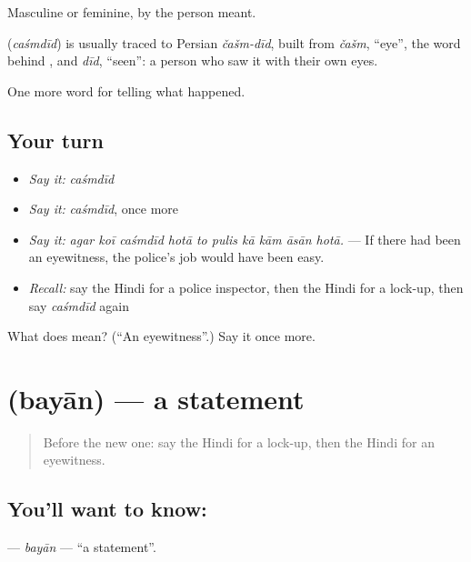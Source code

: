 Masculine or feminine, by the person meant.

\begin{cousinweb}
\textbf{} (\emph{caśmdīd}) is usually traced to Persian \emph{čašm-dīd}, built from \emph{čašm}, \textquotedblleft{}eye\textquotedblright{}, the word behind \textbf{}, and \emph{dīd}, \textquotedblleft{}seen\textquotedblright{}: a person who saw it with their own eyes.
\end{cousinweb}

\begin{grammarlens}[title={What you've built}]
One more word for telling what happened.
\end{grammarlens}

\subsection*{Your turn}
\begin{itemize}
\raggedright
  \item \emph{Say it:} \emph{caśmdīd}
  \item \emph{Say it:} \emph{caśmdīd}, once more
  \item \emph{Say it:} \emph{agar koī caśmdīd hotā to pulis kā kām āsān hotā.} — If there had been an eyewitness, the police's job would have been easy.
  \item \emph{Recall:} say the Hindi for a police inspector, then the Hindi for a lock-up, then say \emph{caśmdīd} again
\end{itemize}

\begin{tcolorbox}[breakable,colback=teal!4,colframe=teal!35!black,title={Before you move on}]
What does  mean? (\textquotedblleft{}An eyewitness\textquotedblright{}.) Say it once more.
\end{tcolorbox}
\section[\texorpdfstring{\hi{बयान} (bayān)}{बयान (bayān)}]{ (bayān) — a statement}

\label{lesson:HI-C291-bayan}



\begin{quote}
Before the new one: say the Hindi for a lock-up, then the Hindi for an eyewitness.
\end{quote}

\subsection*{You'll want to know: }
\textbf{} — \emph{bayān} — \textquotedblleft{}a statement\textquotedblright{}.

